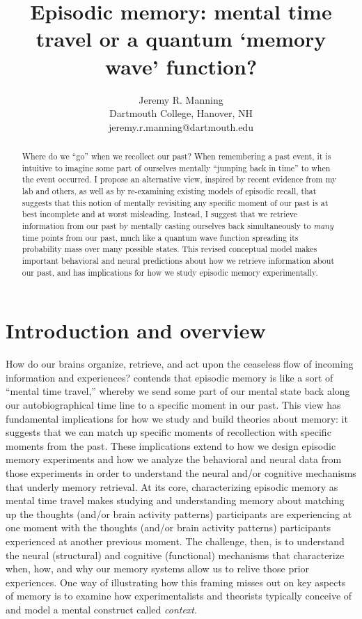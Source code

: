 \documentclass{article}
\title{Episodic memory: mental time travel or a quantum `memory wave' function?}
\author{Jeremy R. Manning\\Dartmouth College, Hanover, NH\\jeremy.r.manning@dartmouth.edu}
\begin{document}
\maketitle

\begin{abstract}
Where do we ``go'' when we recollect our past?  When remembering a past event, it is intuitive to imagine some part of ourselves mentally ``jumping back in time'' to when the event occurred. I propose an alternative view, inspired by recent evidence from my lab and others, as well as by re-examining existing models of episodic recall, that suggests that this notion of mentally revisiting any specific moment of our past is at best incomplete and at worst misleading.  Instead, I suggest that we retrieve information from our past by mentally casting ourselves back simultaneously to \textit{many} time points from our past, much like a quantum wave function spreading its probability mass over many possible states.  This revised conceptual model makes important behavioral and neural predictions about how we retrieve information about our past, and has implications for how we study episodic memory experimentally.
\end{abstract}

\section*{Introduction and overview}
How do our brains organize, retrieve, and act upon the ceaseless flow of incoming information and experiences?  \cite{Tulv83} contends that episodic memory is like a sort of ``mental time travel,'' whereby we send some part of our mental state back along our autobiographical time line to a specific moment in our past.  This view has fundamental implications for how we study and build theories about memory: it suggests that we can match up specific moments of recollection with specific moments from the past.  These implications extend to how we design episodic memory experiments and how we analyze the behavioral and neural data from those experiments in order to understand the neural and/or cognitive mechanisms that underly memory retrieval.  At its core, characterizing episodic memory as mental time travel makes studying and understanding memory about matching up the thoughts (and/or brain activity patterns) participants are experiencing at one moment with the thoughts (and/or brain activity patterns) participants experienced at another previous moment.  The challenge, then, is to understand the neural (structural) and cognitive (functional) mechanisms that characterize when, how, and why our memory systems allow us to relive those prior experiences.  One way of illustrating how this framing misses out on key aspects of memory is to examine how experimentalists and theorists typically conceive of and model a mental construct called \textit{context}.
\end{document}
